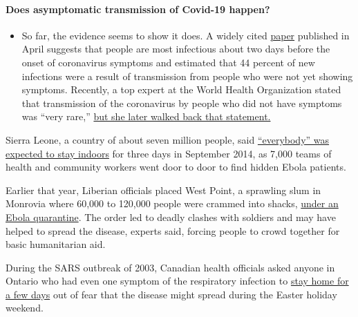 \begin{itemize}
{  \paragraph{Does asymptomatic transmission of Covid-19
  happen?}\label{does-asymptomatic-transmission-of-covid-19-happen}}

  \begin{itemize}
  \tightlist
  \item
    So far, the evidence seems to show it does. A widely cited
    \href{https://www.nature.com/articles/s41591-020-0869-5}{paper}
    published in April suggests that people are most infectious about
    two days before the onset of coronavirus symptoms and estimated that
    44 percent of new infections were a result of transmission from
    people who were not yet showing symptoms. Recently, a top expert at
    the World Health Organization stated that transmission of the
    coronavirus by people who did not have symptoms was ``very rare,''
    \href{https://www.nytimes.com/2020/06/09/world/coronavirus-updates.html?action=click\&pgtype=Article\&state=default\&region=MAIN_CONTENT_3\&context=storylines_faq\#link-1f302e21}{but
    she later walked back that statement.}
  \end{itemize}
\end{itemize}

Sierra Leone, a country of about seven million people, said
\href{https://www.nytimes.com/2014/09/07/world/africa/sierra-leone-to-impose-widespread-ebola-quarantine.html}{``everybody''
was expected to stay indoors} for three days in September 2014, as 7,000
teams of health and community workers went door to door to find hidden
Ebola patients.

Earlier that year, Liberian officials placed West Point, a sprawling
slum in Monrovia where 60,000 to 120,000 people were crammed into
shacks,
\href{https://www.nytimes.com/2014/08/29/world/africa/in-liberias-capital-an-ebola-outbreak-like-no-other.html}{under
an Ebola quarantine}. The order led to deadly clashes with soldiers and
may have helped to spread the disease, experts said, forcing people to
crowd together for basic humanitarian aid.

During the SARS outbreak of 2003, Canadian health officials asked anyone
in Ontario who had even one symptom of the respiratory infection to
\href{https://www.nytimes.com/2003/04/18/world/fearing-sars-ontario-urges-wider-quarantines.html}{stay
home for a few days} out of fear that the disease might spread during
the Easter holiday weekend.

